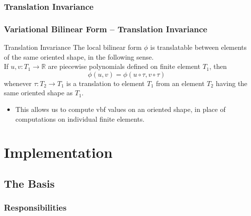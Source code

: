 \documentclass[compress]{beamer}
\begin{document}
\subsubsection{Translation Invariance}

\begin{frame}
  \frametitle{Variational Bilinear Form -- Translation Invariance}
  \begin{block}{Translation Invariance}
  The local bilinear form $\phi$ is translatable between elements of the same oriented shape, in the following sense.\\
  If $u, v: T_1 \rightarrow \mathbb{R}$ are piecewise polynomials defined on finite element $T_1$, then
    $$\phi(u, v) = \phi(u \circ \tau, v \circ \tau)$$
      whenever $\tau: T_2 \rightarrow T_1$ is a translation to element $T_1$ from an element $T_2$ having
      the same oriented shape as $T_1$.
  \end{block}
  \pause
  \begin{itemize}[<+->]
    \item This allows us to compute vbf values on an oriented shape, in place of computations on individual finite elements.
  \end{itemize}
\end{frame}

\section{Implementation}

\subsection{The Basis}

\subsubsection{Responsibilities}
\end{document}
